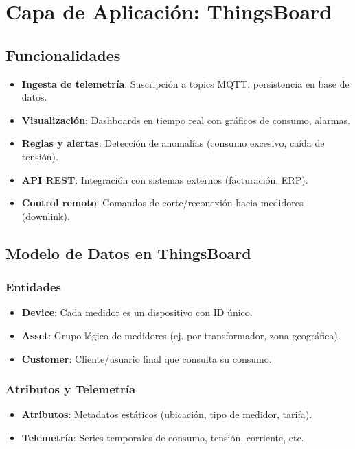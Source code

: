\section{Capa de Aplicación: ThingsBoard}

\subsection{Funcionalidades}

\begin{itemize}
    \item \textbf{Ingesta de telemetría}: Suscripción a topics MQTT, persistencia en base de datos.
    \item \textbf{Visualización}: Dashboards en tiempo real con gráficos de consumo, alarmas.
    \item \textbf{Reglas y alertas}: Detección de anomalías (consumo excesivo, caída de tensión).
    \item \textbf{API REST}: Integración con sistemas externos (facturación, ERP).
    \item \textbf{Control remoto}: Comandos de corte/reconexión hacia medidores (downlink).
\end{itemize}

\subsection{Modelo de Datos en ThingsBoard}

\subsubsection{Entidades}

\begin{itemize}
    \item \textbf{Device}: Cada medidor es un dispositivo con ID único.
    \item \textbf{Asset}: Grupo lógico de medidores (ej. por transformador, zona geográfica).
    \item \textbf{Customer}: Cliente/usuario final que consulta su consumo.
\end{itemize}

\subsubsection{Atributos y Telemetría}

\begin{itemize}
    \item \textbf{Atributos}: Metadatos estáticos (ubicación, tipo de medidor, tarifa).
    \item \textbf{Telemetría}: Series temporales de consumo, tensión, corriente, etc.
\end{itemize}

